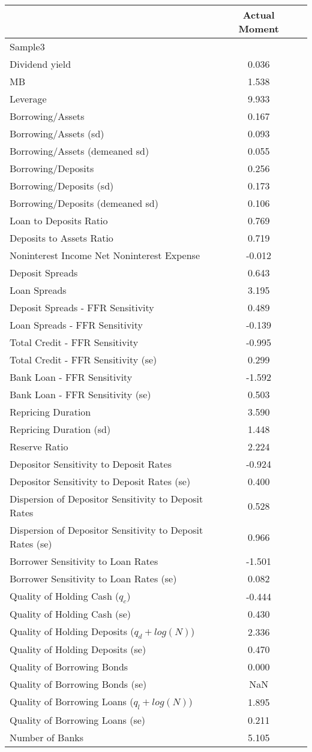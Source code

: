 \begin{tabular*}{\hsize}{@{\hskip\tabcolsep\extracolsep\fill}l*{2}{c}}\hline \hline & \textbf{Actual Moment}  &    \\ [1ex] \hline  Sample3&\\
Dividend yield&0.036&\\
MB&1.538&\\
Leverage&9.933&\\
Borrowing/Assets&0.167&\\
Borrowing/Assets (sd)&0.093&\\
Borrowing/Assets (demeaned sd)&0.055&\\
Borrowing/Deposits&0.256&\\
Borrowing/Deposits (sd)&0.173&\\
Borrowing/Deposits (demeaned sd)&0.106&\\
Loan to Deposits Ratio&0.769&\\
Deposits to Assets Ratio&0.719&\\
Noninterest Income Net Noninterest Expense&-0.012&\\
Deposit Spreads&0.643&\\
Loan Spreads&3.195&\\
Deposit Spreads - FFR Sensitivity&0.489&\\
Loan Spreads - FFR Sensitivity&-0.139&\\
Total Credit - FFR Sensitivity&-0.995&\\
Total Credit - FFR Sensitivity (se)&0.299&\\
Bank Loan - FFR Sensitivity&-1.592&\\
Bank Loan - FFR Sensitivity (se)&0.503&\\
Repricing Duration&3.590&\\
Repricing Duration (sd)&1.448&\\
Reserve Ratio&2.224&\\
Depositor Sensitivity to Deposit Rates&-0.924&\\
Depositor Sensitivity to Deposit Rates (se)&0.400&\\
Dispersion of Depositor Sensitivity to Deposit Rates&0.528&\\
Dispersion of Depositor Sensitivity to Deposit Rates (se)&0.966&\\
Borrower Sensitivity to Loan Rates&-1.501&\\
Borrower Sensitivity to Loan Rates (se)&0.082&\\
Quality of Holding Cash ($q_c$)&-0.444&\\
Quality of Holding Cash (se)&0.430&\\
Quality of Holding Deposits ($q_d+log(N)$)&2.336&\\
Quality of Holding Deposits (se)&0.470&\\
Quality of Borrowing Bonds&0.000&\\
Quality of Borrowing Bonds (se)&NaN&\\
Quality of Borrowing Loans ($q_l+log(N)$)&1.895&\\
Quality of Borrowing Loans (se)&0.211&\\
Number of Banks&5.105&\\
\hline \hline \end{tabular*}
